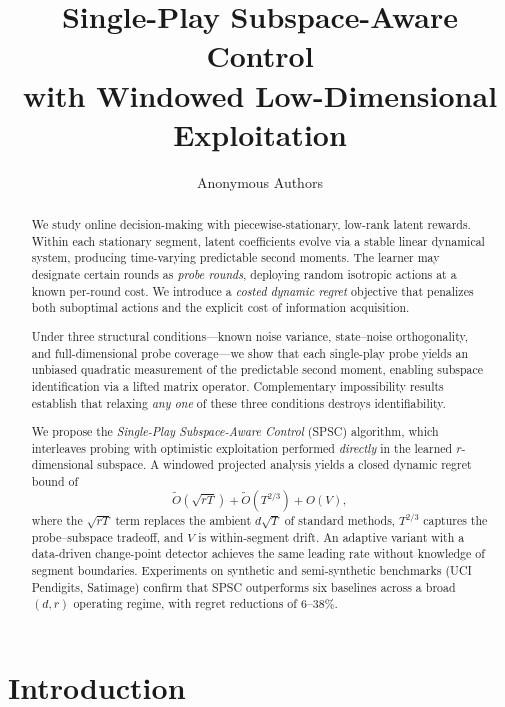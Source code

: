 \documentclass{article}
\title{Single-Play Subspace-Aware Control \\ with Windowed Low-Dimensional Exploitation}
\author{
  Anonymous Authors
}
\begin{document}
\maketitle

\begin{abstract}
We study online decision-making with piecewise-stationary, low-rank latent rewards.
Within each stationary segment, latent coefficients evolve via a stable linear dynamical system, producing time-varying predictable second moments.
The learner may designate certain rounds as \emph{probe rounds}, deploying random isotropic actions at a known per-round cost.
We introduce a \emph{costed dynamic regret} objective that penalizes both suboptimal actions and the explicit cost of information acquisition.

Under three structural conditions---known noise variance, state--noise orthogonality, and full-dimensional probe coverage---we show that each single-play probe yields an unbiased quadratic measurement of the predictable second moment, enabling subspace identification via a lifted matrix operator.
Complementary impossibility results establish that relaxing \emph{any one} of these three conditions destroys identifiability.

We propose the \emph{Single-Play Subspace-Aware Control} (SPSC) algorithm, which interleaves probing with optimistic exploitation performed \emph{directly} in the learned $r$-dimensional subspace.
A windowed projected analysis yields a closed dynamic regret bound of
\[
\widetilde{O}\!\left(\sqrt{rT}\right) + \widetilde{O}\!\left(T^{2/3}\right) + O(V),
\]
where the $\sqrt{rT}$ term replaces the ambient $d\sqrt{T}$ of standard methods, $T^{2/3}$ captures the probe--subspace tradeoff, and $V$ is within-segment drift.
An adaptive variant with a data-driven change-point detector achieves the same leading rate without knowledge of segment boundaries.
Experiments on synthetic and semi-synthetic benchmarks (UCI Pendigits, Satimage) confirm that SPSC outperforms six baselines across a broad $(d,r)$ operating regime, with regret reductions of 6--38\%.
\end{abstract}

\section{Introduction}
\label{sec:intro}
\end{document}
